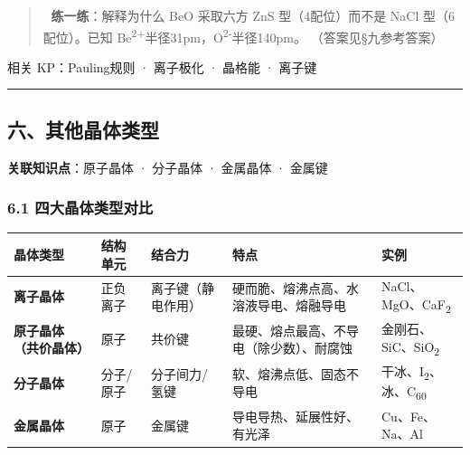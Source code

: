 \documentclass[a4paper,11pt]{ctexart}
\newcounter{none}
\begin{document}
\begin{quote}
📝 \textbf{练一练}：解释为什么 BeO 采取六方 ZnS 型（4配位）而不是 NaCl 型（6配位）。已知 Be\textsuperscript{2+}半径31pm，O\textsuperscript{2-}半径140pm。
（答案见§九参考答案）
\end{quote}

相关 KP：Pauling规则 · 离子极化 · 晶格能 · 离子键

\begin{center}\rule{0.5\linewidth}{0.5pt}\end{center}

\subsection{六、其他晶体类型}\label{ux516dux5176ux4ed6ux6676ux4f53ux7c7bux578b}

\textbf{关联知识点}：原子晶体 · 分子晶体 · 金属晶体 · 金属键

\subsubsection{6.1 四大晶体类型对比}\label{ux56dbux5927ux6676ux4f53ux7c7bux578bux5bf9ux6bd4}

{\def\LTcaptype{none} %
\begin{longtable}[]{@{}
  >{\raggedright\arraybackslash}p{}
  >{\raggedright\arraybackslash}p{}
  >{\raggedright\arraybackslash}p{}
  >{\raggedright\arraybackslash}p{}
  >{\raggedright\arraybackslash}p{}@{}}
\toprule\noalign{}
\begin{minipage}[b]{\linewidth}\raggedright
晶体类型
\end{minipage} & \begin{minipage}[b]{\linewidth}\raggedright
结构单元
\end{minipage} & \begin{minipage}[b]{\linewidth}\raggedright
结合力
\end{minipage} & \begin{minipage}[b]{\linewidth}\raggedright
特点
\end{minipage} & \begin{minipage}[b]{\linewidth}\raggedright
实例
\end{minipage} \\
\midrule\noalign{}
\endhead
\bottomrule\noalign{}
\endlastfoot
\textbf{离子晶体} & 正负离子 & 离子键（静电作用） & 硬而脆、熔沸点高、水溶液导电、熔融导电 & NaCl、MgO、CaF\textsubscript{2} \\
\textbf{原子晶体（共价晶体）} & 原子 & 共价键 & 最硬、熔点最高、不导电（除少数）、耐腐蚀 & 金刚石、SiC、SiO\textsubscript{2} \\
\textbf{分子晶体} & 分子/原子 & 分子间力/氢键 & 软、熔沸点低、固态不导电 & 干冰、I\textsubscript{2}、冰、C\textsubscript{60} \\
\textbf{金属晶体} & 原子 & 金属键 & 导电导热、延展性好、有光泽 & Cu、Fe、Na、Al \\
\end{longtable}
}
\end{document}
